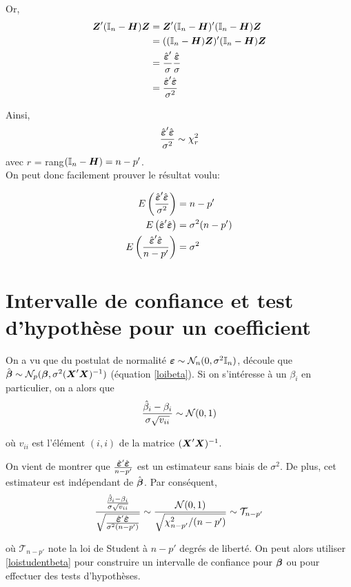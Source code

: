 Or,
\begin{align*}
\bo Z'(\boI_n-\boH) \bo Z &= \bo Z'(\boI_n-\boH)'(\boI_n-\boH) \bo Z \\
&= ((\boI_n-\boH)\bo Z)' (\boI_n-\boH) \bo Z \\
&= \frac{\hboeps'}{\sigma} \frac{\hboeps}{\sigma} \\
&= \frac{\hboeps'\hboeps}{\sigma^2}
\end{align*}


Ainsi,
$$ \frac{\hboeps'\hboeps}{\sigma^2} \sim \chi^2_r$$
avec $r$ = rang$(\boI_n-\boH) = n-p'$. \\

On peut donc facilement prouver le résultat voulu:

\begin{align*}
E \left( \frac{\hboeps'\hboeps}{\sigma^2} \right) &= n-p' \\
E \left( \hboeps'\hboeps \right) &= \sigma^2 (n-p') \\
E \left( \frac{\hboeps'\hboeps}{n-p'} \right) &= \sigma^2
\end{align*}


\section{Intervalle de confiance et test d'hypothèse pour un coefficient}
\label{sec:infbetaRLM}

On a vu que du postulat de normalité $\boeps \sim \N_n(0,\sigma^2\boI_n)$, découle que $\hbobeta \sim \N_p(\bobeta,\sigma^2 (\boX'\boX)^{-1})$ (équation \ref{loibeta}). Si on s'intéresse à un $\beta_i$ en particulier, on a alors que
\begin{eqnarray*}
	\frac{\hat{\beta}_i-\beta_i}{\sigma \sqrt{v_{ii}}} \sim \N(0,1)
\end{eqnarray*}

où $v_{ii}$ est l'élément $(i,i)$ de la matrice $(\boX'\boX)^{-1}$.



On vient de montrer que $\frac{\hboeps'\hboeps}{n-p'}$ est un estimateur sans biais de $\sigma^2$. De plus, cet estimateur est indépendant de $\hbobeta$. Par conséquent,
\begin{eqnarray}
	\frac{\frac{\hat{\beta}_i-\beta_i}{\sigma \sqrt{v_{ii}}}}{\sqrt{\frac{\hboeps'\hboeps}{\sigma^2(n-p')}}} \sim \frac{\N(0,1)}{\sqrt{\chi^2_{n-p'}/(n-p')}} \sim \mathcal{T}_{n-p'}
	\label{loistudentbeta}
\end{eqnarray}

où $\mathcal{T}_{n-p'}$ note la loi de Student à $n-p'$ degrés de liberté. On peut alors utiliser \eqref{loistudentbeta} pour construire un intervalle de confiance pour $\bobeta$ ou pour effectuer des tests d'hypothèses.

